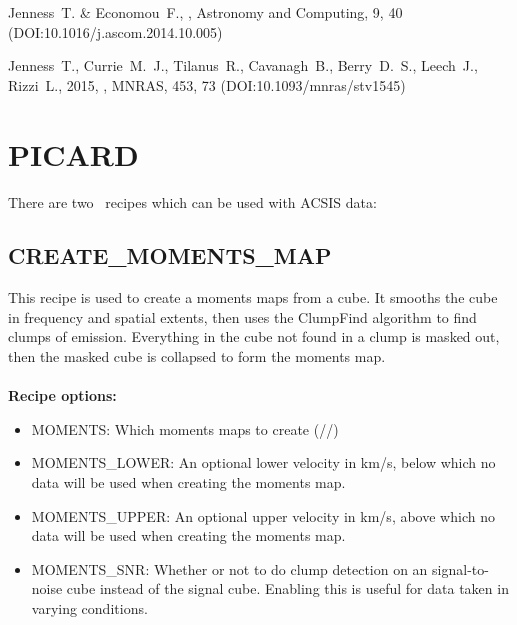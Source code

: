 \documentclass[11pt,oneside,chapters]{starlink}
\begin{document}
\begin{thebibliography}{}
Jenness~T. \& Economou~F.,
, Astronomy and
Computing, 9, 40 (DOI:10.1016/j.ascom.2014.10.005)

Jenness~T., Currie~M.~J., Tilanus~R., Cavanagh~B., Berry~D.~S.,
Leech~J., Rizzi~L., 2015, ,
MNRAS, 453, 73 (DOI:10.1093/mnras/stv1545)

\end{thebibliography}

\newpage
\appendix

\chapter{PICARD}
\label{app:picard}
There are two \picard\ recipes which can be used with ACSIS data:

\section{CREATE\_MOMENTS\_MAP}

This recipe is used to create a moments maps from a cube. It smooths
the cube in frequency and spatial extents, then uses the ClumpFind
algorithm to find clumps of emission. Everything in the cube not found
in a clump is masked out, then the masked cube is collapsed to form
the moments map.
\\\\
\textbf{Recipe options:}
\begin{itemize}
\item MOMENTS:  Which moments maps to create (//)
\param{[integ]}

\item MOMENTS\_LOWER: An optional lower velocity in km/s, below which
no data will be used when creating the moments map.  \param{[undef]}

\item MOMENTS\_UPPER: An optional upper velocity in km/s, above which
no data will be used when creating the moments map. \param{[undef]}

\item MOMENTS\_SNR: Whether or not to do clump detection on an
signal-to-noise cube instead of the signal cube. Enabling this is
useful for data taken in varying conditions. \param{[0]}
\end{itemize}
\end{document}
